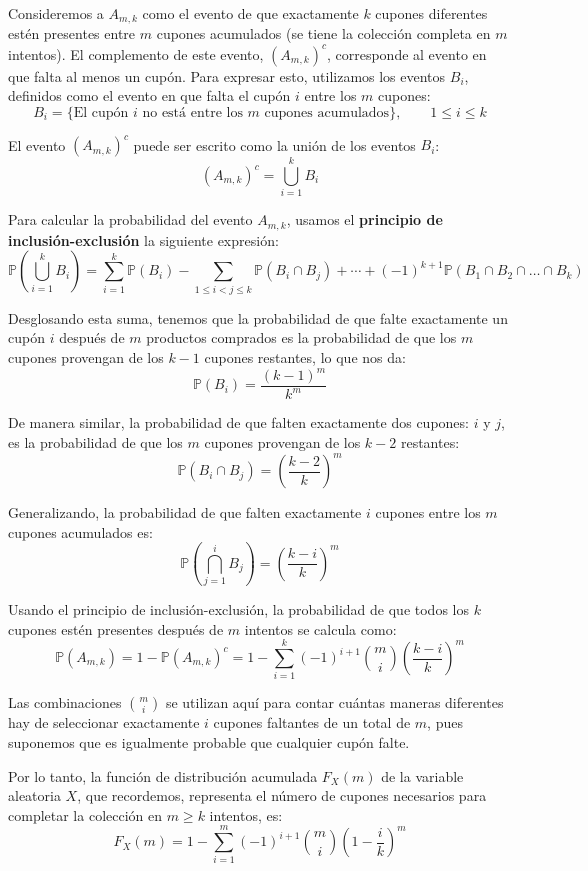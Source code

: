 \documentclass[../Main.tex]{subfiles}
\begin{document}
Consideremos a \(A_{m,k}\) como el evento de que exactamente \(k\) cupones diferentes estén presentes entre \(m\) cupones acumulados (se tiene la colección completa en $m$ intentos). El complemento de este evento, \((A_{m,k})^c\), corresponde al evento en que falta al menos un cupón. Para expresar esto, utilizamos los eventos \(B_i\), definidos como el evento en que falta el cupón \(i\) entre los \(m\) cupones:
\[
B_i = \{\text{El cupón } i \text{ no está entre los } m \text{ cupones acumulados}\}, \qquad 1\leq i\leq k
\]

El evento \((A_{m,k})^c\) puede ser escrito como la unión de los eventos \(B_i\):
\[
(A_{m,k})^c = \bigcup_{i=1}^{k} B_i
\]

Para calcular la probabilidad del evento \(A_{m,k}\), usamos el \textbf{principio de inclusión-exclusión} la siguiente expresión:
\[
\mathbb{P}\left(\bigcup_{i=1}^{k} B_i\right) = \sum_{i=1}^{k} \mathbb{P}(B_i) - \sum_{1 \leq i < j \leq k} \mathbb{P}(B_i \cap B_j) + \cdots + (-1)^{k+1} \mathbb{P}(B_1 \cap B_2 \cap \dots \cap B_{k})
\]

Desglosando esta suma, tenemos que la probabilidad de que falte exactamente un cupón \(i\) después de \(m\) productos comprados es la probabilidad de que los \(m\) cupones provengan de los \(k-1\) cupones restantes, lo que nos da:
\[
\mathbb{P}(B_i) = \frac{(k-1)^m}{k^m}
\]

De manera similar, la probabilidad de que falten exactamente dos cupones: \(i\) y \(j\), es la probabilidad de que los \(m\) cupones provengan de los \(k-2\) restantes:
\[
\mathbb{P}(B_i \cap B_j) = \left(\frac{k-2}{k}\right)^m
\]

Generalizando, la probabilidad de que falten exactamente \(i\) cupones entre los \(m\) cupones acumulados es:
\[
\mathbb{P}\left(\bigcap_{j=1}^{i} B_j \right) = \left( \frac{k-i}{k} \right)^m
\]

Usando el principio de inclusión-exclusión, la probabilidad de que todos los \(k\) cupones estén presentes después de \(m\) intentos se calcula como:
\[
\mathbb{P}(A_{m,k}) = 1 - \mathbb{P}(A_{m,k})^c = 1 - \sum_{i=1}^{k} (-1)^{i+1} \binom{m}{i} \left(\frac{k-i}{k}\right)^m
\]

Las combinaciones \(\binom{m}{i}\) se utilizan aquí para contar cuántas maneras diferentes hay de seleccionar exactamente \(i\) cupones faltantes de un total de \(m\), pues suponemos que es igualmente probable que cualquier cupón falte. 

Por lo tanto, la función de distribución acumulada \(F_X(m)\) de la variable aleatoria \(X\), que recordemos, representa el número de cupones necesarios para completar la colección en $m\geq k$ intentos, es:
\[
F_X(m) = 1 - \sum_{i=1}^{m} (-1)^{i+1} \binom{m}{i} \left(1 - \frac{i}{k}\right)^m
\]
\end{document}
